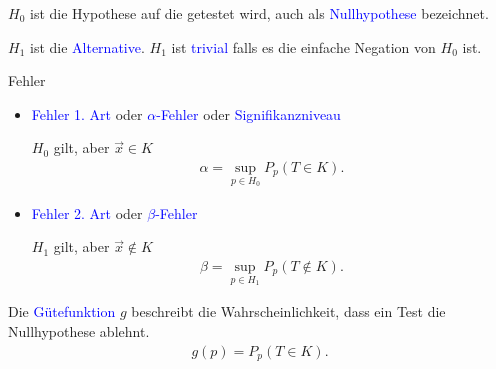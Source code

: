 \documentclass{beamer}
\def\padding{\vspace{0.5cm}}
\def\b{\textcolor{blue}}
\begin{document}
\begin{frame}
    $H_0$ ist die Hypothese auf die getestet wird, auch als \b{Nullhypothese} bezeichnet.\par
    $H_1$ ist die \b{Alternative}. $H_1$ ist \b{trivial} falls es die einfache Negation von $H_0$ ist.\pause\par\padding
    \begin{block}{Fehler}
        \begin{itemize}
            \item \b{Fehler 1. Art} oder \b{$\alpha$-Fehler} oder \b{Signifikanzniveau}\par
                $H_0$ gilt, aber $\overrightarrow{x} \in K$
                \begin{align*}
                    \alpha = \sup_{p \in H_0} P_p(T \in K).
                \end{align*}\pause
            \item \b{Fehler 2. Art} oder \b{$\beta$-Fehler}\par
                $H_1$ gilt, aber $\overrightarrow{x} \not\in K$
                \begin{align*}
                    \beta = \sup_{p \in H_1} P_p(T \not\in K).
                \end{align*}
        \end{itemize}
    \end{block}
\end{frame}

\begin{frame}
    Die \b{Gütefunktion} $g$ beschreibt die Wahrscheinlichkeit, dass ein Test die Nullhypothese ablehnt.
    \begin{align*}
        g(p) = P_p(T \in K).
    \end{align*}
\end{frame}
\end{document}
